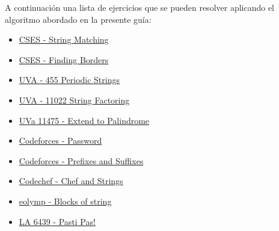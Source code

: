 A continuación una lista de ejercicios que se pueden resolver aplicando el algoritmo abordado en la presente guía:

\begin{itemize}
	\item \href{https://cses.fi/problemset/task/1753/}{CSES - String Matching}
	\item \href{https://cses.fi/problemset/task/1732/}{CSES - Finding Borders}
	\item \href{http://uva.onlinejudge.org/index.php?option=onlinejudge&page=show_problem&problem=396}{UVA - 455 Periodic Strings}
	\item \href{http://uva.onlinejudge.org/index.php?option=onlinejudge&page=show_problem&problem=1963}{UVA - 11022 String Factoring}
	\item \href{http://uva.onlinejudge.org/index.php?option=com_onlinejudge&Itemid=8&category=24&page=show_problem&problem=2470}{UVa 11475 - Extend to Palindrome}
	\item \href{http://codeforces.com/problemset/problem/126/B}{Codeforces - Password}
	\item \href{http://codeforces.com/problemset/problem/432/D}{Codeforces - Prefixes and Suffixes}
	\item \href{https://www.codechef.com/problems/CHSTR}{Codechef - Chef and Strings}
	\item \href{https://www.eolymp.com/en/problems/1309}{eolymp - Blocks of string}
	\item \href{https://icpcarchive.ecs.baylor.edu/index.php?option=com_onlinejudge&Itemid=8&category=588&page=show_problem&problem=4450}{LA 6439 - Pasti Pas!}
\end{itemize}